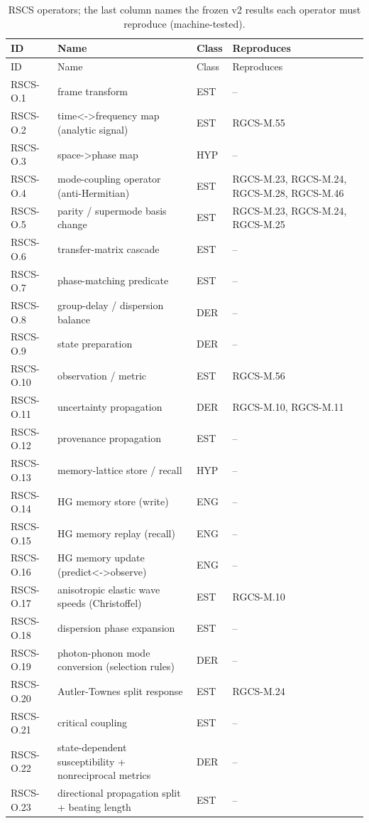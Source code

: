 \begin{longtable}{@{}l p{6.4cm} l p{3.4cm}@{}}
\caption{RSCS operators; the last column names the frozen v2 results each operator must reproduce (machine-tested).}\label{tab:ops}\\
\toprule ID & Name & Class & Reproduces \\ \midrule
\endfirsthead
\toprule ID & Name & Class & Reproduces \\ \midrule
\endhead
RSCS-O.1 & frame transform & EST & -- \\
RSCS-O.2 & time<->frequency map (analytic signal) & EST & RGCS-M.55 \\
RSCS-O.3 & space->phase map & HYP & -- \\
RSCS-O.4 & mode-coupling operator (anti-Hermitian) & EST & RGCS-M.23, RGCS-M.24, RGCS-M.28, RGCS-M.46 \\
RSCS-O.5 & parity / supermode basis change & EST & RGCS-M.23, RGCS-M.24, RGCS-M.25 \\
RSCS-O.6 & transfer-matrix cascade & EST & -- \\
RSCS-O.7 & phase-matching predicate & EST & -- \\
RSCS-O.8 & group-delay / dispersion balance & DER & -- \\
RSCS-O.9 & state preparation & DER & -- \\
RSCS-O.10 & observation / metric & EST & RGCS-M.56 \\
RSCS-O.11 & uncertainty propagation & DER & RGCS-M.10, RGCS-M.11 \\
RSCS-O.12 & provenance propagation & EST & -- \\
RSCS-O.13 & memory-lattice store / recall & HYP & -- \\
RSCS-O.14 & HG memory store (write) & ENG & -- \\
RSCS-O.15 & HG memory replay (recall) & ENG & -- \\
RSCS-O.16 & HG memory update (predict<->observe) & ENG & -- \\
RSCS-O.17 & anisotropic elastic wave speeds (Christoffel) & EST & RGCS-M.10 \\
RSCS-O.18 & dispersion phase expansion & EST & -- \\
RSCS-O.19 & photon-phonon mode conversion (selection rules) & DER & -- \\
RSCS-O.20 & Autler-Townes split response & EST & RGCS-M.24 \\
RSCS-O.21 & critical coupling & EST & -- \\
RSCS-O.22 & state-dependent susceptibility + nonreciprocal metrics & DER & -- \\
RSCS-O.23 & directional propagation split + beating length & EST & -- \\
\bottomrule
\end{longtable}
